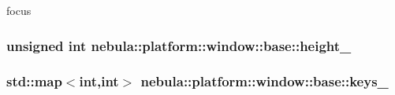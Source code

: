 focus \hypertarget{classnebula_1_1platform_1_1window_1_1base_a715501bdc4b96c2e70745935dfa6ec02}{
\subsubsection[{height\_\-}]{\setlength{\rightskip}{0pt plus 5cm}unsigned int {\bf nebula::platform::window::base::height\_\-}}}
\label{classnebula_1_1platform_1_1window_1_1base_a715501bdc4b96c2e70745935dfa6ec02}
\hypertarget{classnebula_1_1platform_1_1window_1_1base_a40e3611e00f67c3f0b2c59ad8fb05547}{
\subsubsection[{keys\_\-}]{\setlength{\rightskip}{0pt plus 5cm}std::map$<$int,int$>$ {\bf nebula::platform::window::base::keys\_\-}}}
\label{classnebula_1_1platform_1_1window_1_1base_a40e3611e00f67c3f0b2c59ad8fb05547}


